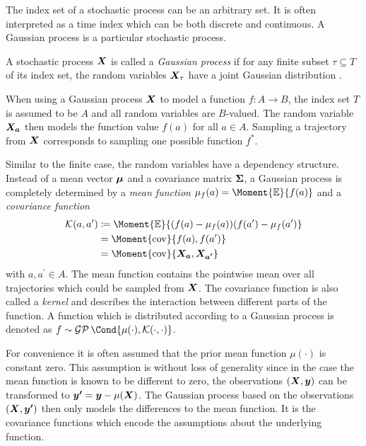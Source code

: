 The index set of a stochastic process can be an arbitrary set.
It is often interpreted as a time index which can be both discrete and continuous.
A Gaussian process is a particular stochastic process.
\begin{definition}
    \label{def:gaussian_process}
    A stochastic process $\bm{X}$ is called a \emph{Gaussian process} if for any finite subset $\tau \subseteq T$ of its index set, the random variables $\bm{X}_\tau$ have a joint Gaussian distribution \cite{astrom_introduction_1971}.
\end{definition}
When using a Gaussian process $\bm{X}$ to model a function $f : A \to B$, the index set $T$ is assumed to be $A$ and all random variables are $B$-valued.
The random variable $\bm{X_a}$ then models the function value $f(a)$ for all $a \in A$.
Sampling a trajectory from $\bm{X}$ corresponds to sampling one possible function $f^\ast$.

Similar to the finite case, the random variables have a dependency structure.
Instead of a mean vector $\bm{\mu}$ and a covariance matrix $\bm{\Sigma}$, a Gaussian process is completely determined by a \emph{mean function} $\mu_f(a) = \Moment{\E}{f(a)}$ and a \emph{covariance function}
\begin{align}
    \K(a, a^\prime) &\coloneqq \Moment{\E}{(f(a) - \mu_f(a))(f(a^\prime) - \mu_f(a^\prime)} \\
    &= \Moment{\cov}{f(a), f(a^\prime)} \\
    &= \Moment{\cov}{\rv{X_a}, \rv{X_{a^\prime}}}
\end{align}
with $a, a^\prime \in A$.
The mean function contains the pointwise mean over all trajectories which could be sampled from $\bm{X}$.
The covariance function is also called a \emph{kernel} and describes the interaction between different parts of the function.
A function which is distributed according to a Gaussian process is denoted as $f \sim \GP\Cond{\mu(\cdot), \K(\cdot, \cdot)}$.

For convenience it is often assumed that the prior mean function $\mu(\cdot)$ is constant zero.
This assumption is without loss of generality \cite{rasmussen_gaussian_2006} since in the case the mean function is known to be different to zero, the observations $\left( \bm{X}, \bm{y} \right)$ can be transformed to $\bm{y^\prime} = \bm{y} - \mu(\bm{X})$.
The Gaussian process based on the observations $\left( \bm{X}, \bm{y^\prime} \right)$ then only models the differences to the mean function.
It is the covariance functions which encode the assumptions about the underlying function.


